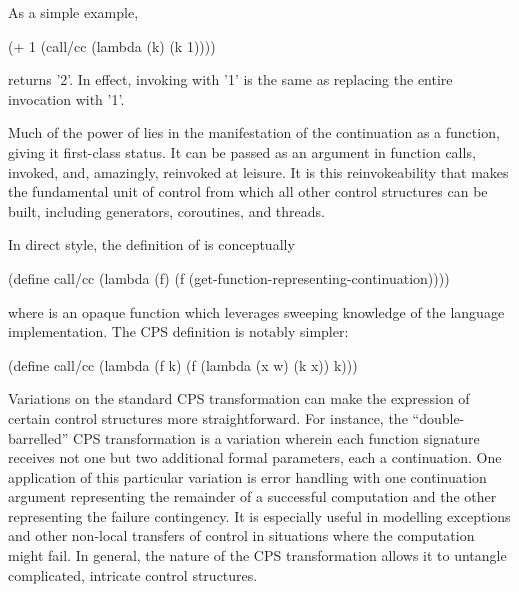 As a simple example,
\begin{schemeblock}
(+ 1 (call/cc
       (lambda (k)
         (k 1))))
\end{schemeblock}
returns \scheme'2'. In effect, invoking  with \scheme'1' is the same 
as replacing the entire  invocation with \scheme'1'.

Much of the power of  lies in the manifestation of the continuation as a
function, giving it first-class status. It can be passed as an argument in function calls,
invoked, and, amazingly, reinvoked at leisure. It is this reinvokeability that makes
 the fundamental unit of control from which all other control structures can
be built, including generators, coroutines, and threads.


In direct style, the definition of  is conceptually 
\begin{schemeblock}
(define call/cc
  (lambda (f)
    (f (get-function-representing-continuation))))
\end{schemeblock}
where  is an opaque function which leverages
sweeping knowledge of the language implementation. The CPS definition is notably simpler:
\begin{schemeblock}
(define call/cc
  (lambda (f k)
    (f (lambda (x w) (k x)) k)))
\end{schemeblock}

Variations on the standard CPS transformation can make the expression of certain control
structures more straightforward. For instance, the ``double-barrelled'' CPS transformation
is a variation wherein each function signature receives not one but two additional formal
parameters, each a continuation. One application of this particular variation is error
handling with one continuation argument representing the remainder of a successful
computation and the other representing the failure contingency. It is especially useful in
modelling exceptions and other non-local transfers of control in situations where the
computation might fail. In general, the nature of the CPS transformation allows it to
untangle complicated, intricate control structures.


